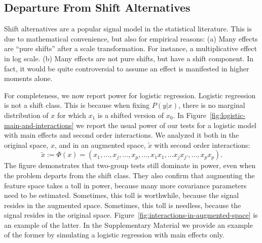 \documentclass[]{bio}
\begin{document}
\subsection{Departure From Shift Alternatives}
\label{sec:logistic}
Shift alternatives are a popular signal model in the statistical literature. 
This is due to mathematical convenience, but also for empirical reasons: 
(a) Many effects are ``pure shifts'' after a scale transformation. For instance, a multiplicative effect in log scale.
(b) Many effects are not pure shifts, but have a shift component. 
In fact, it would be quite controversial to assume an effect is manifested in higher moments alone. 

For completeness, we now report power for logistic regression.
Logistic regression is not a shift class. 
This is because when fixing $P(y|x)$, there is no marginal distribution of $x$ for which $x_1 $ is a shifted version of $x_0$.
In Figure~\ref{fig:logistic-main-and-interactions} we report the usual power of our tests for a logistic model with main effects and second order interactions.
We analyzed it both in the original space, $x$, and in an augmented space, $\tilde x$ with second order interactions:
$$\tilde{x}:=\Phi(x)=(x_1,\dots,x_j,\dots,x_p,\dots,x_1x_1,\dots x_jx_{j'},\dots,x_{p}x_{p}).$$
The figure demonstrates that two-group tests still dominate in power, even when the problem departs from the shift class.
They also confirm that augmenting the feature space takes a toll in power, because many more covariance parameters need to be estimated. 
Sometimes, this toll is worthwhile, because the signal resides in the augmented space. 
Sometimes, this toll is needless, because the signal resides in the original space. 
Figure~\ref{fig:interactions-in-augmented-space} is an example of the latter. 
In the Supplementary Material we provide an example of the former by simulating a logistic regression with main effects only.
\end{document}
